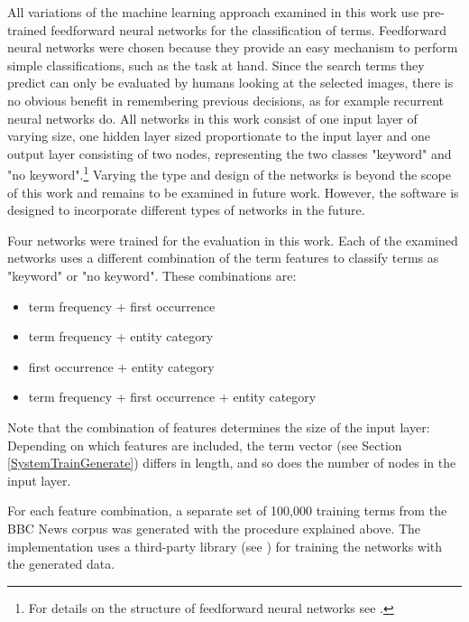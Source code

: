 \documentclass[11pt,a4paper,twoside]{article}
\begin{document}
\noindent All variations of the machine learning approach examined in this work use pre-trained feedforward neural networks for the classification of terms. Feedforward neural networks were chosen because they provide an easy mechanism to perform simple classifications, such as the task at hand. Since the search terms they predict can only be evaluated by humans looking at the selected images, there is no obvious benefit in remembering previous decisions, as for example recurrent neural networks do. All networks in this work consist of one input layer of varying size, one hidden layer sized proportionate to the input layer and one output layer consisting of two nodes, representing the two classes "keyword" and "no keyword".\footnote{For details on the structure of feedforward neural networks see \cite{Bishop1995NeuralRecognition}.} Varying the type and design of the networks is beyond the scope of this work and remains to be examined in future work. However, the software is designed to incorporate different types of networks in the future.

Four networks were trained for the evaluation in this work. Each of the examined networks uses a different combination of the term features to classify terms as "keyword" or "no keyword". These combinations are:

\vspace{-.5em}
\begin{itemize}
    \setlength\itemsep{0em}
    \item term frequency + first occurrence
    \item term frequency + entity category
    \item first occurrence + entity category
    \item term frequency + first occurrence + entity category
\end{itemize}
\vspace{-.5em}

\noindent Note that the combination of features determines the size of the input layer: Depending on which features are included, the term vector (see Section \ref{SystemTrainGenerate}) differs in length, and so does the number of nodes in the input layer.

For each feature combination, a separate set of 100,000 training terms from the BBC News corpus was generated with the procedure explained above. The implementation uses a third-party library (see \cite{BrainJSBrain.js:JavaScript}) for training the networks with the generated data.
\end{document}
